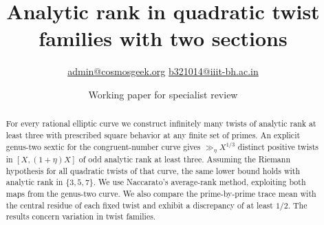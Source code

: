 \documentclass[11pt]{article}
\title{Analytic rank in quadratic twist families with two sections}
\author{\small\href{mailto:admin@cosmosgeek.org}{admin@cosmosgeek.org}
\quad\href{mailto:b321014@iiit-bh.ac.in}{b321014@iiit-bh.ac.in}}
\date{Working paper for specialist review}
\begin{document}
\maketitle
\begin{abstract}
For every rational elliptic curve we construct infinitely many twists of analytic rank at least three with prescribed square behavior at any finite set of primes. An explicit genus-two sextic for the congruent-number curve gives $\gg_\eta X^{1/3}$ distinct positive twists in $[X,(1+\eta)X]$ of odd analytic rank at least three. Assuming the Riemann hypothesis for all quadratic twists of that curve, the same lower bound holds with analytic rank in $\{3,5,7\}$. We use Naccarato's average-rank method, exploiting both maps from the genus-two curve. We also compare the prime-by-prime trace mean with the central residue of each fixed twist and exhibit a discrepancy of at least $1/2$. The results concern variation in twist families.
\end{abstract}
\end{document}
